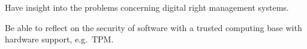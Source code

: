 \item Have insight into the problems concerning digital right management 
systems.
\item Be able to reflect on the security of software with a trusted computing 
base with hardware support, e.g.~\ac{TPM}.
